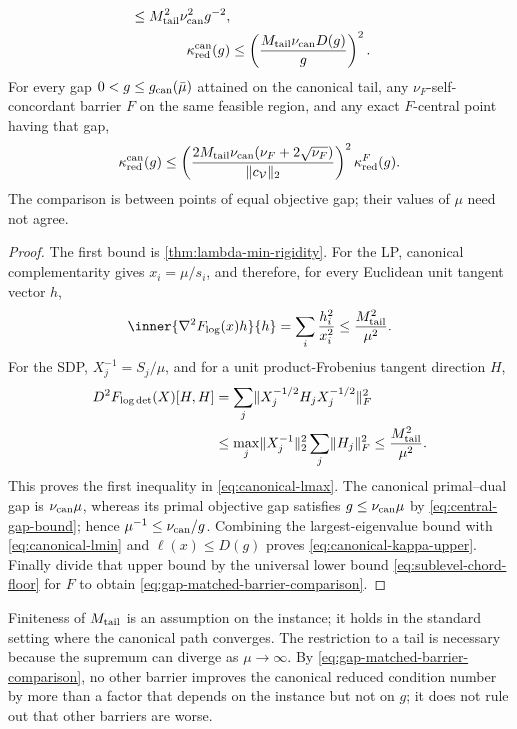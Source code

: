 \begin{theorem}
\begin{align}
 \leq M_{\rm tail}^2\nu_{\rm can}^2g^{-2},
 \label{eq:canonical-lmax}\\
 \kappa_{\rm red}^{\rm can}(g)&\leq
 \left(\frac{M_{\rm tail}\nu_{\rm can}D(g)}g\right)^2.
 \label{eq:canonical-kappa-upper}
\end{align}
For every gap $0<g\leq g_{\rm can}(\bar\mu)$ attained on the canonical tail,
any $\nu_F$-self-concordant barrier $F$ on the same feasible region, and any
exact $F$-central point having that gap,
\begin{equation}
 \kappa_{\rm red}^{\rm can}(g)
 \leq
 \left(
  \frac{2M_{\rm tail}\nu_{\rm can}
              (\nu_F+2\sqrt{\nu_F})}
       {\lVert c_{\mathcal V}\rVert_2}
 \right)^2
 \kappa_{\rm red}^{F}(g).
 \label{eq:gap-matched-barrier-comparison}
\end{equation}
The comparison is between points of equal objective gap; their values of
$\mu$ need not agree.
\end{theorem}

\begin{proof}
The first bound is \cref{thm:lambda-min-rigidity}.  For the LP, canonical
complementarity gives $x_i=\mu/s_i$, and therefore, for every Euclidean unit
tangent vector $h$,
\[
 \inner{\nabla^2F_{\log}(x)h}{h}
 =\sum_i\frac{h_i^2}{x_i^2}
 \leq\frac{M_{\rm tail}^2}{\mu^2}.
\]
For the SDP, $X_j^{-1}=S_j/\mu$, and for a unit product-Frobenius tangent
direction $H$,
\begin{align*}
 D^2F_{\log\det}(X)[H,H]
 &=\sum_j\lVert X_j^{-1/2}H_jX_j^{-1/2}\rVert_F^2\\
 &\leq \max_j\lVert X_j^{-1}\rVert_2^2\sum_j\lVert H_j\rVert_F^2
 \leq\frac{M_{\rm tail}^2}{\mu^2}.
\end{align*}
This proves the first inequality in \eqref{eq:canonical-lmax}.  The canonical
primal--dual gap is $\nu_{\rm can}\mu$, whereas its primal objective gap
satisfies $g\leq\nu_{\rm can}\mu$ by \eqref{eq:central-gap-bound}; hence
$\mu^{-1}\leq\nu_{\rm can}/g$.  Combining the largest-eigenvalue bound with
\eqref{eq:canonical-lmin} and $\ell(x)\leq D(g)$ proves
\eqref{eq:canonical-kappa-upper}.  Finally divide that upper bound by the
universal lower bound \eqref{eq:sublevel-chord-floor} for $F$ to obtain
\eqref{eq:gap-matched-barrier-comparison}.
\end{proof}

Finiteness of $M_{\rm tail}$ is an assumption on the instance; it holds in
the standard setting where the canonical path converges.  The restriction to
a tail is necessary because the supremum can diverge as $\mu\to\infty$.  By
\eqref{eq:gap-matched-barrier-comparison}, no other barrier improves the
canonical reduced condition number by more than a factor that depends on the
instance but not on $g$; it does not rule out that other barriers are worse.


